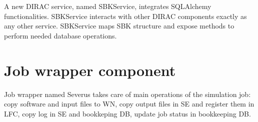 \documentclass[a4paper]{jpconf}
\begin{document}
A new DIRAC service, named SBKService, integrates SQLAlchemy functionalities. SBKService interacts with other DIRAC components exactly as any other service. SBKService maps SBK structure and expose methods to perform needed database operations.




 
\section{Job wrapper component}
\label{sec:severus}

Job wrapper named Severus takes care of main operations of the simulation job: copy software and input files to WN, copy output files in SE and register them in LFC, copy log in SE and bookkeping DB, update job status in bookkeeping DB.

\end{document}
